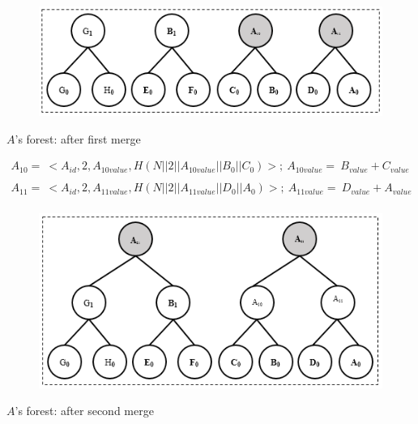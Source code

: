 \documentclass[%
  slidesonly,%
  semlayer%
  ]{seminar}                                  %
\begin{document}
\begin{slide}
      \begin{figure}[h!]
        \centering
        \includegraphics[scale = 0.5]{images/a-forest-first-merge.png}
      \end{figure}
      \begin{center}
        $A$'s forest: after first merge
      \end{center}
      \begin{tiny}
        \begin{equation*}
          \begin{array}{l}
            A_{10} =\ <A_{id},2,A_{10value},H(N||2||A_{10value}||B_{0}||C_{0})>;\ A_{10value} =\ B_{value} + C_{value}\\
            \\
            A_{11} =\ <A_{id},2,A_{11value},H(N||2||A_{11value}||D_{0}||A_{0})>;\ A_{11value} =\ D_{value} + A_{value}\\
          \end{array}     
        \end{equation*}
      \end{tiny}

      \begin{figure}[h!]
        \centering
        \includegraphics[scale = 0.5]{images/a-forest-second-merge.png}
      \end{figure}
        \begin{center}
          $A$'s forest: after second merge
        \end{center}


\end{slide}
\end{document}
